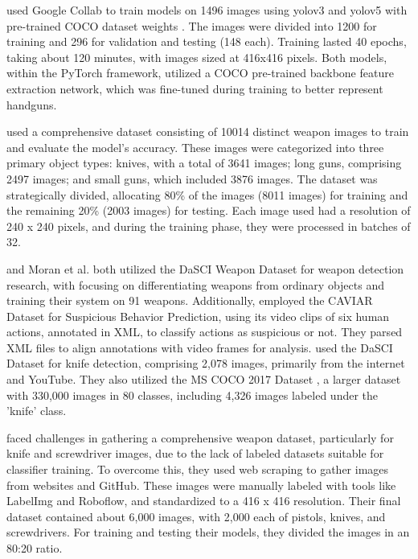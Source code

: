 \citet{rfc5} used Google Collab \cite{rfc26} to train models on 1496 images using \ac{yolo}v3 and \ac{yolo}v5 with pre-trained COCO dataset weights \cite{rfc16}. The images were divided into 1200 for training and 296 for validation and testing (148 each). Training lasted 40 epochs, taking about 120 minutes, with images sized at 416x416 pixels. Both models, within the PyTorch framework, utilized a COCO pre-trained backbone feature extraction network, which was fine-tuned during training to better represent handguns.

\citet{rfc6} used a comprehensive dataset consisting of 10014 distinct weapon images 
to train and evaluate the model's accuracy. These images were categorized into three primary object types: knives, 
with a total of 3641 images; long guns, comprising 2497 images; and small guns, which included 3876 images. The 
dataset was strategically divided, allocating 80\% of the images (8011 images) for training and the remaining 20\% 
(2003 images) for testing. Each image used had a resolution of 240 x 240 pixels, and during the training phase, they 
were processed in batches of 32.

\citet{rfc7} and Moran et al. \citet{rfc18} both utilized the DaSCI Weapon Dataset \cite{rfc29} for weapon detection research, with \citet{rfc7} focusing on differentiating weapons from ordinary objects and training their system on 91 weapons. Additionally, employed the CAVIAR Dataset \cite{rfc30} for Suspicious Behavior Prediction, using its video clips of six human actions, annotated in XML, to classify actions as suspicious or not. They parsed XML files to align annotations with video frames for analysis. \citet{rfc18} used the DaSCI Dataset \cite{rfc29} for knife detection, comprising 2,078 images, primarily from the internet and YouTube. They also utilized the MS COCO 2017 Dataset \cite{rfc16}, a larger dataset with 330,000 images in 80 classes, including 4,326 images labeled under the 'knife' class.

\citet{rfc17} faced challenges in gathering a comprehensive weapon dataset, particularly for knife and screwdriver images, due to the lack of labeled datasets suitable for classifier training. To overcome this, they used web scraping to gather images from websites and GitHub. These images were manually labeled with tools like LabelImg and Roboflow, and standardized to a 416 x 416 resolution. Their final dataset contained about 6,000 images, with 2,000 each of pistols, knives, and screwdrivers. For training and testing their models, they divided the images in an 80:20 ratio.

